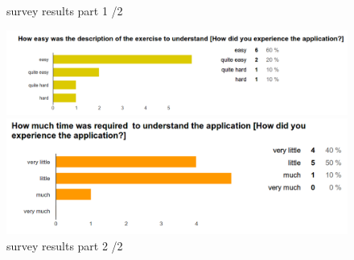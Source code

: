 \begin{figure}[b!]
\begin{minipage}{0.6\textwidth}
    \end{minipage}
  \caption{survey results part 1 /2 }
  \label{fig:survey1}
\end{figure}

\begin{figure}[b!]
  \centering
    \begin{minipage}{0.7\textwidth}
      \centering
        \includegraphics[width=1\textwidth]{00_resources/figures/survey_results4.png}
    \end{minipage}
    \begin{minipage}{0.7\textwidth}
      \centering
        \includegraphics[width=1\textwidth]{00_resources/figures/survey_results5.png}
    \end{minipage}
  \caption{survey results part 2 /2 }
  \label{fig:survey2}
\end{figure}
